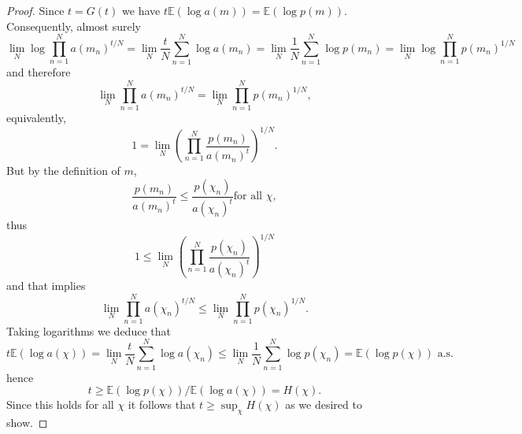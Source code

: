 \documentclass[10pt,a4paper]{amsart}
\newcommand{\ee}{{\mathbb E}}
\begin{document}
\begin{proof}
Since $t=G(t)$ we have $t\ee(\log a(m))=\ee(\log p(m))$.
Consequently, almost surely
\begin{equation*}
    \lim_{N}\log \prod_{n=1}^{N}a(m_{n})^{t/N}
  = \lim_{N}\frac{t}{N}\sum_{n=1}^{N}\log a(m_{n})
  =\lim_{N}\frac{1}{N}\sum_{n=1}^{N}\log p(m_{n})
  =\lim_{N}\log \prod_{n=1}^{N}p(m_{n})^{1/N}
\end{equation*}
and therefore 
\begin{equation*}
     \lim_{N}\prod_{n=1}^{N}a(m_{n})^{t/N}=\lim_{N}\prod_{n=1}^{N}p(m_{n})^{1/N},
\end{equation*}
equivalently,  
\begin{equation*}
      1=\lim_{N}\left( \prod_{n=1}^{N}\frac{p(m_{n})}{a(m_{n})^{t}}\right) ^{1/N}.
\end{equation*}
But by the definition of $m$, 
\begin{equation*}
     \frac{p(m_{n})}{a(m_{n})^{t}}\leq \frac{p(\chi _{n})}{a(\chi _{n})^{t}}\text{for all }\chi ,
\end{equation*}
thus
\begin{equation*}
   1\leq \lim_{N}\left( \prod_{n=1}^{N}\frac{p(\chi _{n})}{a(\chi _{n})^{t}}\right) ^{1/N}
\end{equation*}
and that implies
\begin{equation*}
   \lim_{N}\prod_{n=1}^{N}a(\chi _{n})^{t/N}\leq 
           \lim_{N}\prod_{n=1}^{N}p(\chi_{n})^{1/N}.
\end{equation*}
Taking logarithms we deduce that
\begin{equation*}
   t \ee(\log a(\chi ))=\lim_{N}\frac{t}{N}\sum_{n=1}^{N}\log a(\chi_{n})
     \leq \lim_{N}\frac{1}{N}\sum_{n=1}^{N}\log p(\chi _{n})=\ee(\log p(\chi ))\text{ a.s.}
\end{equation*}
hence  
\begin{equation*}
    t\geq \ee(\log p(\chi ))/\ee(\log a(\chi ))=H(\chi ).
\end{equation*}
Since this holds for all $\chi $ it follows that $t\geq \sup_{\chi }H(\chi )$
as we desired to show.

\medskip 


\end{proof}
\end{document}
